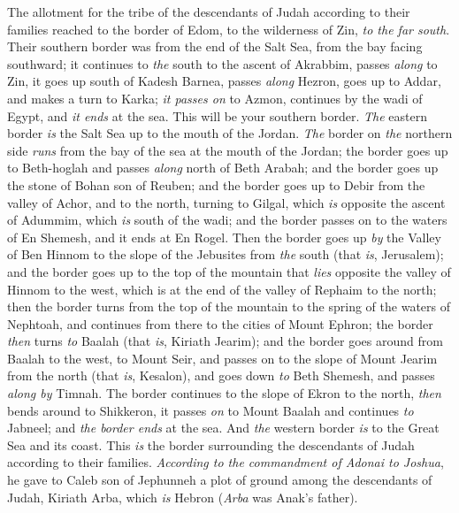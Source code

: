 \begin{biblechapter} %
 The allotment for the tribe of the descendants of Judah according to their families reached to the border of Edom, to the wilderness of Zin, \textit{to the far south}.
\verse Their southern border was from the end of the Salt Sea, from the bay facing southward;
\verse it continues to \textit{the} south to the ascent of Akrabbim, passes \textit{along} to Zin, it goes up south of Kadesh Barnea, passes \textit{along} Hezron, goes up to Addar, and makes a turn to Karka;
\verse \textit{it passes on} to Azmon, continues by the wadi of Egypt, and \textit{it ends} at the sea. This will be your southern border.
\verse \textit{The} eastern border \textit{is} the Salt Sea up to the mouth of the Jordan. \textit{The} border on \textit{the} northern side \textit{runs} from the bay of the sea at the mouth of the Jordan;
\verse the border goes up to Beth-hoglah and passes \textit{along} north of Beth Arabah; and the border goes up the stone of Bohan son of Reuben;
\verse and the border goes up to Debir from the valley of Achor, and to the north, turning to Gilgal, which \textit{is} opposite the ascent of Adummim, which \textit{is} south of the wadi; and the border passes on to the waters of En Shemesh, and it ends at En Rogel.
\verse Then the border goes up \textit{by} the Valley of Ben Hinnom to the slope of the Jebusites from \textit{the} south (that \textit{is}, Jerusalem); and the border goes up to the top of the mountain that \textit{lies} opposite the valley of Hinnom to the west, which is at the end of the valley of Rephaim to the north;
\verse then the border turns from the top of the mountain to the spring of the waters of Nephtoah, and continues from there to the cities of Mount Ephron; the border \textit{then} turns \textit{to} Baalah (that \textit{is}, Kiriath Jearim);
\verse and the border goes around from Baalah to the west, to Mount Seir, and passes on to the slope of Mount Jearim from the north (that \textit{is}, Kesalon), and goes down \textit{to} Beth Shemesh, and passes \textit{along by} Timnah.
\verse The border continues to the slope of Ekron to the north, \textit{then} bends around to Shikkeron, it passes \textit{on} to Mount Baalah and continues \textit{to} Jabneel; and \textit{the border ends} at the sea.
\verse And \textit{the} western border \textit{is} to the Great Sea and its coast. This \textit{is} the border surrounding the descendants of Judah according to their families.
\verse \textit{According to the commandment of Adonai to Joshua}, he gave to Caleb son of Jephunneh a plot of ground among the descendants of Judah, Kiriath Arba, which \textit{is} Hebron (\textit{Arba} was Anak’s father).

\end{biblechapter}

